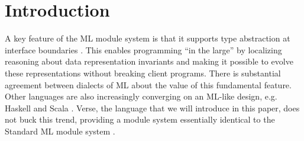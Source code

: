 \documentclass[preprint]{sigplanconf}
\newcommand{\Verse}{{\textsf{\small Verse}}}
\begin{document}

\section{Introduction}\label{intro}

A key feature of the ML {module system} is that it supports type abstraction at interface boundaries \cite{MacQueen:1984:MSM:800055.802036}. This enables programming ``in the large'' by localizing reasoning about data representation invariants and making it possible to  evolve these representations without breaking client programs. %
There is substantial agreement between dialects of ML about the value of this fundamental feature. Other languages are also increasingly converging on an ML-like design, e.g. Haskell \cite{Kilpatrick:2014:BRH} and Scala \cite{conf/oopsla/AminRO14}. \Verse, the language that we will introduce in this paper, does not buck this trend, providing a module system essentially identical to the Standard ML module system \cite{MacQueen:1984:MSM:800055.802036}. %
\end{document}
